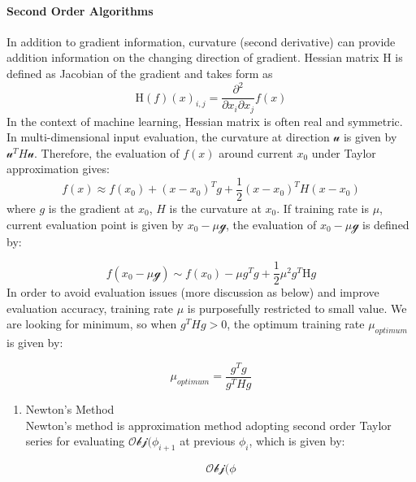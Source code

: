 \paragraph{Second Order Algorithms}
In addition to gradient information, curvature (second derivative) can provide addition information on the changing direction of gradient. Hessian matrix $\mathrm{H}$ is defined as Jacobian of the gradient and takes form as 
\begin{equation}
    \mathrm{H}(f)(x)_{i,j} = \frac{\partial^2}{\partial x_i \partial x_j}f(x)
\end{equation}
In the context of machine learning, Hessian matrix is often real and symmetric. In multi-dimensional input evaluation, the curvature at direction $\mathcal{u}$ is given by $\mathcal{u}^TH\mathcal{u}$. Therefore, the evaluation of $f(x)$ around current $x_0$ under Taylor approximation gives:
\begin{equation}
    \label{eq:TaylorEvaluation}
    f(x) \approx f(x_0)+(x-x_0)^Tg+\frac{1}{2}(x-x_0)^TH(x-x_0)
\end{equation}
where $g$ is the gradient at $x_0$, $H$ is the curvature at $x_0$. If training rate is $\mu$, current evaluation point is given by $x_0-\mu\mathcal{g}$, the evaluation of $x_0-\mu\mathcal{g}$ is defined by:

\begin{equation}
\label{eq:TaylorEvaStep}
    f(x_0-\mu\mathcal{g}) \sim f(x_0) - \mu g^Tg + \frac{1}{2}\mu^2g^T\mathrm{H}g
\end{equation}
In order to avoid evaluation issues (more discussion as below) and improve evaluation accuracy, training rate $\mu$ is purposefully restricted to small value. We are looking for minimum, so when $g^THg > 0$, the optimum training rate $\mu_{optimum}$ is given by:

\begin{equation}
    \mu_{optimum} = \frac{g^Tg}{g^THg}
\end{equation}

\begin{enumerate}
    \item Newton's Method\\
Newton's method is approximation method adopting second order Taylor series for evaluating $\mathcal{Obj}(\phi_{i+1}$ at previous $\phi_i$, which is given by:

\begin{equation}
    \mathcal{Obj}(\phi    
\end{equation}

\end{enumerate}